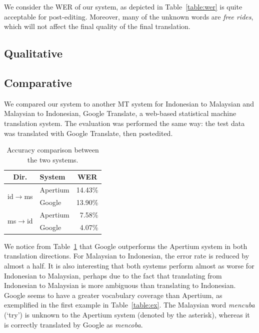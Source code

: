 \documentclass[10pt,a5paper,twoside]{article}
\begin{document}
We consider the WER of our system, as depicted in Table~\ref{table:wer} is quite acceptable for post-editing. Moreover, many of the unknown words are \emph{free rides}, which will not affect the final quality of the final translation.

\subsection{Qualitative}

\subsection{Comparative}
We compared our system to another MT system for Indonesian to Malaysian and Malaysian to Indonesian, Google Translate, a web-based statistical machine translation system. The evaluation was performed the same way: the test data was translated with Google Translate, then postedited.

\begin{table}[htbp]
  \begin{center}
  \begin{tabular}{clr}
  \toprule
  \bf{Dir.}                 & \bf{System}         & \multicolumn{1}{c}{\bf{WER}}  \\
  \midrule
  \multirow{2}{*}{id$\rightarrow$ms} & Apertium & 14.43\% \\
                                     & Google & 13.90\% \\
  \midrule
  \multirow{2}{*}{ms$\rightarrow$id} & Apertium & 7.58\% \\
                                     & Google & 4.07\% \\
  \bottomrule
  \end{tabular}
    \caption{Accuracy comparison between the two systems.}
    \label{table:comp}
  \end{center}
\end{table}

We notice from Table~\ref{table:comp} that Google outperforms the Apertium system in both translation directions. For Malaysian to Indonesian, the error rate is reduced by almost a half. It is also interesting that both systems perform almost as worse for Indonesian to Malaysian, perhaps due to the fact that translating from Indonesian to Malaysian is more ambiguous than translating to Indonesian. Google seems to have a greater vocabulary coverage than Apertium, as exemplified in the first example in Table~\ref{table:ex}. The Malaysian word \emph{mencuba} (`try') is unknown to the Apertium system (denoted by the asterisk), whereas it is correctly translated by Google as \emph{mencoba}.
\end{document}
